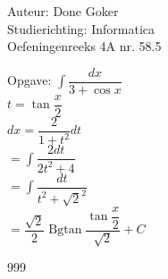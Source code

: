 \documentclass[a4paper]{article}
\begin{document}
  
\noindent \large Auteur: Done Goker \\
\noindent \large Studierichting: Informatica\\
\noindent \large Oefeningenreeks 4A nr. 58.5\\

\medskip

\normalsize

Opgave: $\displaystyle\int \dfrac{dx}{3 + \cos x}$ \\

$t = \tan \dfrac{x}{2} $ \\

$dx = \dfrac{2}{1 + t^2}dt$ \\

$=\displaystyle\int  \dfrac{2dt}{2t^2 + 4}$ \\

$= \displaystyle\int \dfrac{dt}{t^2 + {\sqrt{2}}^2}$ \\

$= \dfrac{\sqrt{2}}{2} \operatorname{Bgtan} \dfrac{\tan\dfrac{x}{2}}{\sqrt{2}} + C $




\begin{thebibliography}{999}
\end{thebibliography}
\end{document}
